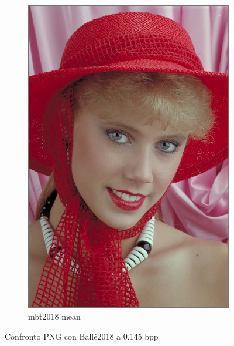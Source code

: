 \begin{figure}[!h]
\begin{subfigure}[]{0.25\textwidth}
        \includegraphics[width=\textwidth]{Immagini/IMAGES/mbt2018_mean_3_IMG0004.pdf}
        \caption{mbt2018 mean}
        \label{fig:CompressedMbt2018Mean}
    \end{subfigure}
    \caption{Confronto PNG con Ballé2018 a 0.145 bpp}
    \label{fig:CompressionMbt2018}
\end{figure}


